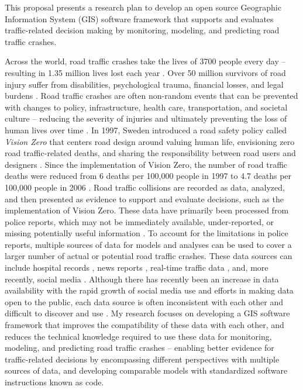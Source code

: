 
This proposal presents a research plan to develop an open source Geographic Information System (GIS) software framework that supports and evaluates traffic-related decision making by monitoring, modeling, and predicting road traffic crashes. 

Across the world, road traffic crashes take the lives of 3700 people every day -- resulting in 1.35 million lives lost each year \cite{who2018roadsafetyreport}. Over 50 million survivors of road injury suffer from disabilities, psychological trauma, financial losses, and legal burdens \cite{who2016postcrashresponse}. Road traffic crashes are often non-random events that can be prevented with changes to policy, infrastructure, health care, transportation, and societal culture -- reducing the severity of injuries and ultimately preventing the loss of human lives over time \cite{bonilla2014injuriesnotaccidents,brubacher2014reduceroadtraumalaw,who2017savelives}. In 1997, Sweden introduced a road safety policy called \textit{Vision Zero} that centers road design around valuing human life, envisioning zero road traffic-related deaths, and sharing the responsibility between road users and designers \cite{belin2012visionzero}. Since the implementation of Vision Zero, the number of road traffic deaths were reduced from 6 deaths per 100,000 people in 1997 to 4.7 deaths per 100,000 people in 2006 \cite{johansson2009visionzero}. Road traffic collisions are recorded as data, analyzed, and then presented as evidence to support and evaluate decisions, such as the implementation of Vision Zero. These data have primarily been processed from police reports, which may not be immediately available, under-reported, or missing potentially useful information \cite{alsop2001underreportnz,loo2007reportroadcrash}. To account for the limitations in police reports, multiple sources of data for models and analyses can be used to cover a larger number of actual or potential road traffic crashes. These data sources can include hospital records \cite{cryer2001biashospitalpolicereports}, news reports \cite{dandona2004trafficdeathssurveillance}, real-time traffic data \cite{roshandel2015realtimecrashreview}, and, more recently, social media \cite{wanichayapong2011socialtrafficdata}. Although there has recently been an increase in data availability with the rapid growth of social media use \cite{perrin2015socialmediause} and efforts in making data open to the public, each data source is often inconsistent with each other and difficult to discover and use \cite{janssen2012opendata}. My research focuses on developing a GIS software framework that improves the compatibility of these data with each other, and reduces the technical knowledge required to use these data for monitoring, modeling, and predicting road traffic crashes -- enabling better evidence for traffic-related decisions by encompassing different perspectives with multiple sources of data, and developing comparable models with standardized software instructions known as code.

